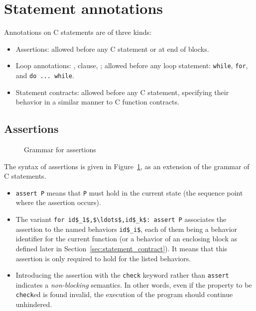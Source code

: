 \section{Statement annotations}

Annotations on C statements are of three kinds:
\begin{itemize}
\item Assertions: allowed before any C statement or
  at end of blocks.
\item{}
  Loop annotations: \invariant, \assigns clause, \variant; allowed
  before any loop statement: \lstinline|while|, \lstinline|for|, and
  \lstinline|do ... while|.
\item{}
  Statement contracts: allowed before any C statement, specifying
  their behavior in a similar manner to C function contracts.
\end{itemize}

\subsection{Assertions}
\label{sec:assertions}
\begin{figure}[t]
  \begin{cadre}
    
  \end{cadre}
  \caption{Grammar for assertions}
  \label{fig:gram:assertions}
\end{figure}

The syntax of assertions is given in Figure~\ref{fig:gram:assertions},
as an extension of the grammar of C statements.

\begin{itemize}
\item
  \lstinline|assert P|  means that \lstinline|P| must hold in the current state
  (the sequence point where the assertion occurs).

\item The variant \lstinline|for id$_1$,$\ldots$,id$_k$: assert P|
  associates the assertion to the named behaviors \lstinline|id$_i$|, each
  of them being a behavior identifier for the current function (or a
  behavior of an enclosing block as defined later in
  Section~\ref{sec:statement_contract}).  It means that this assertion
  is only required to hold for the listed behaviors.
\item Introducing the assertion with the \lstinline|check| keyword rather than \lstinline|assert| indicates a
  \emph{non-blocking} semantics. In other words, even if the property to be \lstinline|check|ed is found invalid,
  the execution of the program should continue unhindered.
\end{itemize}

